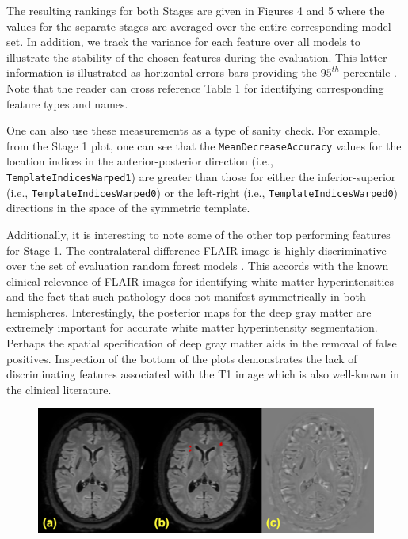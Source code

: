 \documentclass[11pt,]{article}
\begin{document}
The resulting rankings for both Stages are given in Figures 4 and 5
where the values for the separate stages are averaged over the entire
corresponding model set. In addition, we track the variance for each
feature over all models to illustrate the stability of the chosen
features during the evaluation. This latter information is illustrated
as horizontal errors bars providing the \(95^{th}\) percentile
. Note that the reader can
cross reference Table 1 for identifying corresponding feature types and
names.

One can also use these measurements as a type of sanity check. For
example, from the Stage 1 plot, one can see that the
\texttt{MeanDecreaseAccuracy} values for the location indices in the
anterior-posterior direction (i.e., \texttt{TemplateIndicesWarped1}) are
greater than those for either the inferior-superior (i.e.,
\texttt{TemplateIndicesWarped0}) or the left-right (i.e.,
\texttt{TemplateIndicesWarped0}) directions in the space of the
symmetric template.

Additionally, it is interesting to note some of the other top performing
features for Stage 1. The contralateral difference FLAIR image is highly
discriminative over the set of evaluation random forest models
. This accords with the known clinical
relevance of FLAIR images for identifying white matter hyperintensities
and the fact that such pathology does not 
manifest symmetrically in both hemispheres. Interestingly, the posterior
maps for the deep gray matter are extremely important for accurate white
matter hyperintensity segmentation. Perhaps the spatial specification of
deep gray matter aids in the removal of false positives. Inspection of
the bottom of the plots demonstrates the lack of discriminating features
associated with the T1 image which is also well-known in the clinical
literature.

\begin{figure}[htbp]
\centering
\includegraphics{Figures/FLAIRcontralaleteralWithLesions.png}
\caption{}
\end{figure}
\end{document}

